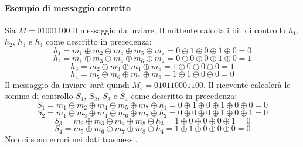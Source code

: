 \documentclass[12pt]{report}
\begin{document}
	\paragraph{Esempio di messaggio corretto}
	Sia $M = 0100 1100$ il messaggio da inviare. Il mittente calcola i bit di controllo $h_1$, $h_2$, $h_3$ e $h_4$ come descritto in precedenza:
	\begin{equation*}
		h_1 = m_1 \oplus m_2 \oplus m_4 \oplus m_5 \oplus m_7 = 0 \oplus 1 \oplus 0 \oplus 1 \oplus 0 = 0
	\end{equation*}
	\begin{equation*}
		h_2 = m_1 \oplus m_3 \oplus m_4 \oplus m_6 \oplus m_7 = 0 \oplus 0 \oplus 0 \oplus 1 \oplus 0 = 1
	\end{equation*}
	\begin{equation*}
		h_3 = m_2 \oplus m_3 \oplus m_4 \oplus m_8 = 1 \oplus 0 \oplus 0 \oplus 0 = 1
	\end{equation*}
	\begin{equation*}
		h_4 = m_5 \oplus m_6 \oplus m_7 \oplus m_8 = 1 \oplus 1 \oplus 0 \oplus 0 = 0
	\end{equation*}
	Il messaggio da inviare sarà quindi $M_s = 0101 1000 1100$. Il ricevente calcolerà le somme di controllo $S_1$, $S_2$, $S_3$ e $S_4$ come descritto in precedenza:
	\begin{equation*}
		S_1 = m_1 \oplus m_2 \oplus m_4 \oplus m_5 \oplus m_7 \oplus h_1 = 0 \oplus 1 \oplus 0 \oplus 1 \oplus 0 \oplus 0 = 0
	\end{equation*}
	\begin{equation*}
		S_2 = m_1 \oplus m_3 \oplus m_4 \oplus m_6 \oplus m_7 \oplus h_2 = 0 \oplus 0 \oplus 0 \oplus 1 \oplus 0 \oplus 1 = 0
	\end{equation*}
	\begin{equation*}
		S_3 = m_2 \oplus m_3 \oplus m_4 \oplus m_8 \oplus h_3 = 1 \oplus 0 \oplus 0 \oplus 0 \oplus 1 = 0
	\end{equation*}
	\begin{equation*}
		S_4 = m_5 \oplus m_6 \oplus m_7 \oplus m_8 \oplus h_4 = 1 \oplus 1 \oplus 0 \oplus 0 \oplus 0 = 0
	\end{equation*}
	Non ci sono errori nei dati trasmessi.
\end{document}
